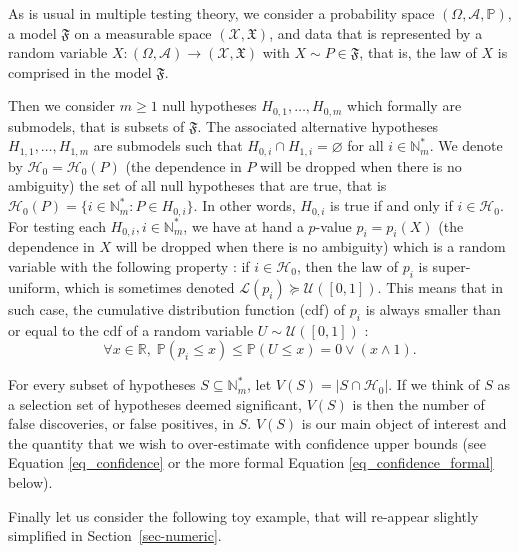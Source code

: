 \documentclass[
  11pt,
  a4paper,
]{article}
\theoremstyle{plain}
\theoremstyle{plain}
\theoremstyle{definition}
\theoremstyle{plain}
\theoremstyle{definition}
\theoremstyle{remark}
\begin{document}
As is usual in multiple testing theory, we consider a probability space
\((\Omega,\mathcal A, \mathbb P)\), a model \(\mathfrak{F}\) on a
measurable space \((\mathcal{X},\mathfrak{X})\), and data that is
represented by a random variable
\(X:(\Omega,\mathcal A)\to(\mathcal{X},\mathfrak{X})\) with
\(X\sim P\in \mathfrak{F}\), that is, the law of \(X\) is comprised in
the model \(\mathfrak{F}\).

Then we consider \(m\geq1\) null hypotheses \(H_{0,1}, \dotsc, H_{0,m}\)
which formally are submodels, that is subsets of \(\mathfrak{F}\). The
associated alternative hypotheses \(H_{1,1}, \dotsc, H_{1,m}\) are
submodels such that \(H_{0,i}\cap H_{1,i}=\varnothing\) for all
\(i\in\mathbb{N}_m^*\). We denote by \(\mathcal{H}_0=\mathcal{H}_0(P)\)
(the dependence in \(P\) will be dropped when there is no ambiguity) the
set of all null hypotheses that are true, that is
\(\mathcal{H}_0(P)=\{i\in\mathbb{N}_m^* : P\in H_{0,i}\}\). In other
words, \(H_{0,i}\) is true if and only if \(i\in\mathcal{H}_0\). For
testing each \(H_{0,i}, i\in\mathbb{N}_m^*\), we have at hand a
\(p\)-value \(p_i=p_i(X)\) (the dependence in \(X\) will be dropped when
there is no ambiguity) which is a random variable with the following
property : if \(i\in\mathcal{H}_0\), then the law of \(p_i\) is
super-uniform, which is sometimes denoted
\(\mathcal L(p_i)\succeq \mathcal{U}([0,1])\). This means that in such
case, the cumulative distribution function (cdf) of \(p_i\) is always
smaller than or equal to the cdf of a random variable
\(U\sim \mathcal{U}([0,1])\) : \begin{equation}
\forall x \in \mathbb{R},\; \mathbb{P}\left(p_i\leq x\right)\leq \mathbb{P}\left(U\leq x\right) = 0\vee(x\wedge 1).
\label{eq_super_unif}
\end{equation}

For every subset of hypotheses \(S\subseteq\mathbb{N}_m^*\), let
\(V(S)=|S\cap\mathcal{H}_0|\). If we think of \(S\) as a selection set
of hypotheses deemed significant, \(V(S)\) is then the number of false
discoveries, or false positives, in \(S\). \(V(S)\) is our main object
of interest and the quantity that we wish to over-estimate with
confidence upper bounds (see Equation \eqref{eq_confidence} or the more
formal Equation \eqref{eq_confidence_formal} below).

Finally let us consider the following toy example, that will re-appear
slightly simplified in Section~\ref{sec-numeric}.
\end{document}
